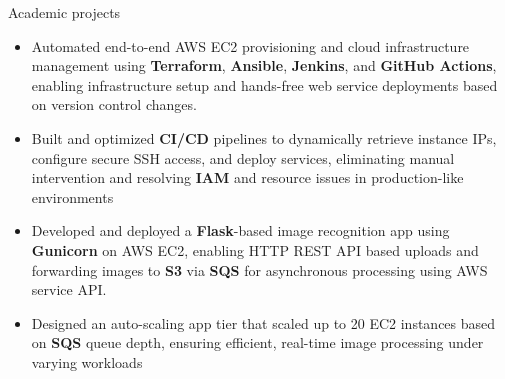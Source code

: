 \documentclass{resume}
\begin{document}
\begin{experienceSection}{Academic projects}

    \projectItem[
        title={End-to-End Deployment Automation},
        duration={Apr 2025},
    ]
    \begin{itemize}
        \vspace{-0.5em}
        \itemsep -6pt {}

        \item Automated end-to-end AWS EC2 provisioning and cloud infrastructure management using \textbf{Terraform}, \textbf{Ansible}, \textbf{Jenkins}, and \textbf{GitHub
Actions}, enabling infrastructure setup and hands-free web service deployments based on version control changes.
        \item Built and optimized \textbf{CI/CD} pipelines to dynamically retrieve instance IPs, configure secure SSH access, and deploy services,
        eliminating manual intervention and resolving \textbf{IAM} and resource issues in production-like environments
    \end{itemize}

    \projectItem[
        title=AWS-Based Face Recognition App,
        duration={May 2024},
    ]
    \begin{itemize}
        \vspace{-0.5em}
        \itemsep -6pt {}
        \item Developed and deployed a \textbf{Flask}-based image recognition app using \textbf{Gunicorn} on AWS EC2, enabling HTTP REST API based uploads and forwarding images to \textbf{S3} via \textbf{SQS} for asynchronous processing using AWS service API.
        \item Designed an auto-scaling app tier that scaled up to 20 EC2 instances based on \textbf{SQS} queue depth, ensuring efficient, real-time image processing under varying workloads
    \end{itemize}
    
\end{experienceSection}
\end{document}
